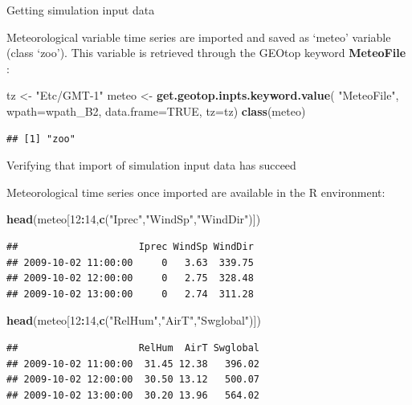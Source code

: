 \documentclass[ignorenonframetext,]{beamer}
\newenvironment{Shaded}{\begin{snugshade}}{\end{snugshade}}
\newcommand{\KeywordTok}[1]{\textcolor[rgb]{0.13,0.29,0.53}{\textbf{#1}}}
\newcommand{\DataTypeTok}[1]{\textcolor[rgb]{0.13,0.29,0.53}{#1}}
\newcommand{\DecValTok}[1]{\textcolor[rgb]{0.00,0.00,0.81}{#1}}
\newcommand{\StringTok}[1]{\textcolor[rgb]{0.31,0.60,0.02}{#1}}
\newcommand{\OtherTok}[1]{\textcolor[rgb]{0.56,0.35,0.01}{#1}}
\newcommand{\OperatorTok}[1]{\textcolor[rgb]{0.81,0.36,0.00}{\textbf{#1}}}
\newcommand{\NormalTok}[1]{#1}
\begin{document}
\begin{frame}[fragile]{Getting simulation input data}

Meteorological variable time series are imported and saved as `meteo'
variable (class `zoo'). This variable is retrieved through the GEOtop
keyword \textbf{MeteoFile} :

\begin{Shaded}
\begin{Highlighting}[]
\NormalTok{tz <-}\StringTok{ "Etc/GMT-1"}
\NormalTok{meteo <-}\StringTok{ }\KeywordTok{get.geotop.inpts.keyword.value}\NormalTok{(}
  \StringTok{"MeteoFile"}\NormalTok{,}
  \DataTypeTok{wpath=}\NormalTok{wpath_B2,}
  \DataTypeTok{data.frame=}\OtherTok{TRUE}\NormalTok{,}
  \DataTypeTok{tz=}\NormalTok{tz)}
\KeywordTok{class}\NormalTok{(meteo)}
\end{Highlighting}
\end{Shaded}

\begin{verbatim}
## [1] "zoo"
\end{verbatim}

\end{frame}

\begin{frame}[fragile]{Verifying that import of simulation input data
has succeed}

Meteorological time series once imported are available in the R
environment:

\begin{Shaded}
\begin{Highlighting}[]
\KeywordTok{head}\NormalTok{(meteo[}\DecValTok{12}\OperatorTok{:}\DecValTok{14}\NormalTok{,}\KeywordTok{c}\NormalTok{(}\StringTok{"Iprec"}\NormalTok{,}\StringTok{"WindSp"}\NormalTok{,}\StringTok{"WindDir"}\NormalTok{)])}
\end{Highlighting}
\end{Shaded}

\begin{verbatim}
##                     Iprec WindSp WindDir
## 2009-10-02 11:00:00     0   3.63  339.75
## 2009-10-02 12:00:00     0   2.75  328.48
## 2009-10-02 13:00:00     0   2.74  311.28
\end{verbatim}

\begin{Shaded}
\begin{Highlighting}[]
\KeywordTok{head}\NormalTok{(meteo[}\DecValTok{12}\OperatorTok{:}\DecValTok{14}\NormalTok{,}\KeywordTok{c}\NormalTok{(}\StringTok{"RelHum"}\NormalTok{,}\StringTok{"AirT"}\NormalTok{,}\StringTok{"Swglobal"}\NormalTok{)])}
\end{Highlighting}
\end{Shaded}

\begin{verbatim}
##                     RelHum  AirT Swglobal
## 2009-10-02 11:00:00  31.45 12.38   396.02
## 2009-10-02 12:00:00  30.50 13.12   500.07
## 2009-10-02 13:00:00  30.20 13.96   564.02
\end{verbatim}

\end{frame}
\end{document}
